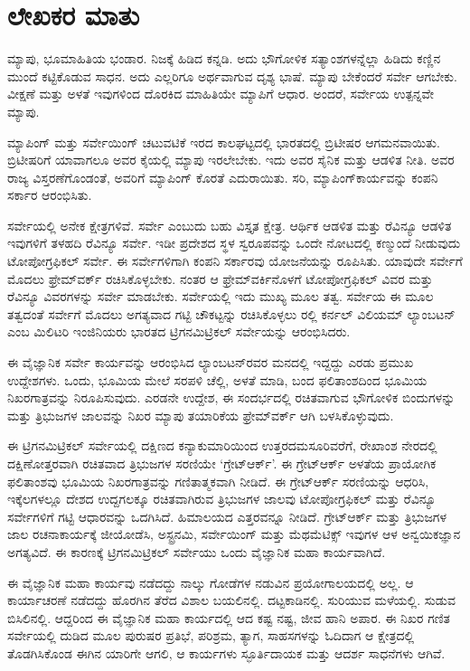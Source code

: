 
\chapter*{ಲೇಖಕರ ಮಾತು}

ಮ್ಯಾಪು, ಭೂಮಾಹಿತಿಯ ಭಂಡಾರ. ನಿಜಕ್ಕೆ ಹಿಡಿದ ಕನ್ನಡಿ. ಅದು ಭೌಗೋಳಿಕ ಸತ್ಯಾಂಶಗಳನ್ನೆಲ್ಲಾ ಹಿಡಿದು ಕಣ್ಣಿನ ಮುಂದೆ ಕಟ್ಟಿಕೊಡುವ ಸಾಧನ. ಅದು ಎಲ್ಲರಿಗೂ ಅರ್ಥವಾಗುವ ದೃಶ್ಯ ಭಾಷೆ. ಮ್ಯಾಪು ಬೇಕೆಂದರೆ ಸರ್ವೇ ಆಗಬೇಕು. ವೀಕ್ಷಣೆ ಮತ್ತು ಅಳತೆ ಇವುಗಳಿಂದ ದೊರಕಿದ ಮಾಹಿತಿಯೇ ಮ್ಯಾಪಿಗೆ ಆಧಾರ. ಅಂದರೆ, ಸರ್ವೇಯ ಉತ್ಪನ್ನವೇ ಮ್ಯಾಪು.

ಮ್ಯಾಪಿಂಗ್​ ಮತ್ತು ಸರ್ವೇಯಿಂಗ್​ ಚಟುವಟಿಕೆ ಇರದ ಕಾಲಘಟ್ಟದಲ್ಲಿ ಭಾರತದಲ್ಲಿ ಬ್ರಿಟೀಷರ ಆಗಮನವಾಯಿತು. ಬ್ರಿಟೀಷರಿಗೆ ಯಾವಾಗಲೂ ಅವರ ಕೈಯಲ್ಲಿ ಮ್ಯಾಪು ಇರಲೇಬೇಕು. ಇದು ಅವರ ಸೈನಿಕ ಮತ್ತು ಆಡಳಿತ ನೀತಿ. ಅವರ ರಾಜ್ಯ ವಿಸ್ತರಣೆಗೊಂಡಂತೆ, ಅವರಿಗೆ ಮ್ಯಾಪಿಂಗ್​ ಕೊರತೆ ಎದುರಾಯಿತು. ಸರಿ, ಮ್ಯಾಪಿಂಗ್​ಕಾರ್ಯವನ್ನು ಕಂಪನಿ ಸರ್ಕಾರ ಆರಂಭಿಸಿತು.

ಸರ್ವೇಯಲ್ಲಿ ಅನೇಕ ಕ್ಷೇತ್ರಗಳಿವೆ. ಸರ್ವೇ ಎಂಬುದು ಬಹು ವಿಸ್ತೃತ ಕ್ಷೇತ್ರ. ಆರ್ಥಿಕ ಆಡಳಿತ ಮತ್ತು ರೆವಿನ್ಯೂ ಆಡಳಿತ ಇವುಗಳಿಗೆ ತಳಹದಿ ರೆವಿನ್ಯೂ ಸರ್ವೇ. ಇಡೀ ಪ್ರದೇಶದ ಸ್ಥಳ ಸ್ವರೂಪವನ್ನು ಒಂದೇ ನೋಟದಲ್ಲಿ ಕಣ್ಮುಂದೆ ನೀಡುವುದು ಟೋಪೋಗ್ರಫಿಕಲ್​ ಸರ್ವೇ. ಈ ಸರ್ವೇಗಳಿಗಾಗಿ ಕಂಪನಿ ಸರ್ಕಾರವು ಯೋಜನೆಯನ್ನು ರೂಪಿಸಿತು. ಯಾವುದೇ ಸರ್ವೇಗೆ ಮೊದಲು ಫ್ರೇಮ್‌ವರ್ಕ್ ರಚಿಸಿಕೊಳ್ಳಬೇಕು. ನಂತರ ಆ ಫ್ರೇಮ್‌ವರ್ಕಿನೊಳಗೆ ಟೋಪೋಗ್ರಫಿಕಲ್​ ವಿವರ ಮತ್ತು ರೆವಿನ್ಯೂ ವಿವರಗಳನ್ನು ಸರ್ವೇ ಮಾಡಬೇಕು. ಸರ್ವೇಯಲ್ಲಿ ಇದು ಮುಖ್ಯ ಮೂಲ ತತ್ವ. ಸರ್ವೇಯ ಈ ಮೂಲ ತತ್ವದಂತೆ ಸರ್ವೇಗೆ ಮೊದಲು ಅಗತ್ಯವಾದ ಗಟ್ಟಿ ಚೌಕಟ್ಟನ್ನು ರಚಿಸಿಕೊಳ್ಳಲು  ರಲ್ಲಿ ಕರ್ನಲ್​ ವಿಲಿಯಮ್ ಲ್ಯಾಂಬಟನ್​ ಎಂಬ ಮಿಲಿಟರಿ ಇಂಜಿನಿಯರು ಭಾರತದ ಟ್ರಿಗನಮಿಟ್ರಿಕಲ್​ ಸರ್ವೇಯನ್ನು ಆರಂಭಿಸಿದರು.

ಈ ವೈಜ್ಞಾನಿಕ ಸರ್ವೇ ಕಾರ್ಯವನ್ನು ಆರಂಭಿಸಿದ ಲ್ಯಾಂಬಟನ್​ರವರ ಮನದಲ್ಲಿ ಇದ್ದದ್ದು ಎರಡು ಪ್ರಮುಖ ಉದ್ದೇಶಗಳು. ಒಂದು, ಭೂಮಿಯ ಮೇಲೆ ಸರಪಳಿ ಚೆಲ್ಲಿ, ಅಳತೆ ಮಾಡಿ, ಬಂದ ಫಲಿತಾಂಶದಿಂದ ಭೂಮಿಯ ನಿಖರಗಾತ್ರವನ್ನು ನಿರೂಪಿಸುವುದು. ಎರಡನೇ ಉದ್ದೇಶ, ಈ ಸಂದರ್ಭದಲ್ಲಿ ರಚಿತವಾಗುವ ಭೌಗೋಳಿಕ ಬಿಂದುಗಳನ್ನು ಮತ್ತು ತ್ರಿಭುಜಗಳ ಜಾಲವನ್ನು ನಿಖರ ಮ್ಯಾಪು ತಯಾರಿಕೆಯ ಫ್ರೇಮ್‌ವರ್ಕ್ ಆಗಿ ಬಳಸಿಕೊಳ್ಳುವುದು.

ಈ ಟ್ರಿಗನಮಿಟ್ರಿಕಲ್​ ಸರ್ವೇಯಲ್ಲಿ ದಕ್ಷಿಣದ ಕನ್ಯಾಕುಮಾರಿಯಿಂದ ಉತ್ತರದ\break ಮಸೂರಿವರೆಗೆ, ರೇಖಾಂಶ ನೇರದಲ್ಲಿ ದಕ್ಷಿಣೋತ್ತರವಾಗಿ ರಚಿತವಾದ ತ್ರಿಭುಜಗಳ ಸರಣಿಯೇ ‘ಗ್ರೇಟ್​ಆರ್ಕ್’. ಈ ಗ್ರೇಟ್​ಆರ್ಕ್ ಅಳತೆಯ ಪ್ರಾಯೋಗಿಕ ಫಲಿತಾಂಶವು ಭೂಮಿಯ ನಿಖರ\-ಗಾತ್ರವನ್ನು ಗಣಿತಾತ್ಮಕವಾಗಿ ನೀಡಿದೆ. ಈ ಗ್ರೇಟ್​ಆರ್ಕ್ ಸರಣಿಯನ್ನು ಆಧರಿಸಿ, ಇಕ್ಕೆಲಗಳಲ್ಲೂ ದೇಶದ ಉದ್ದಗಲಕ್ಕೂ ರಚಿತವಾಗಿರುವ ತ್ರಿಭುಜಗಳ ಜಾಲವು ಟೋಪೋಗ್ರಫಿಕಲ್​ ಮತ್ತು ರೆವಿನ್ಯೂ ಸರ್ವೇಗಳಿಗೆ ಗಟ್ಟಿ ಆಧಾರವನ್ನು ಒದಗಿಸಿದೆ. ಹಿಮಾಲಯದ ಎತ್ತರವನ್ನೂ ನೀಡಿದೆ. ಗ್ರೇಟ್​ಆರ್ಕ್ ಮತ್ತು ತ್ರಿಭುಜಗಳ ಜಾಲ ರಚನಾಕಾರ್ಯಕ್ಕೆ ಜೀಯೋಡೆಸಿ, ಅಸ್ಟ್ರನಮಿ, ಸರ್ವೇಯಿಂಗ್​ ಮತ್ತು ಮೆಥಮೆಟಿಕ್ಸ್​ ಇವುಗಳ ಆಳ ಅನ್ವಯಿಕಜ್ಞಾನ ಅಗತ್ಯವಿದೆ. ಈ ಕಾರಣಕ್ಕೆ ಟ್ರಿಗನಮಿಟ್ರಿಕಲ್​ ಸರ್ವೇಯು ಒಂದು ವೈಜ್ಞಾನಿಕ ಮಹಾ ಕಾರ್ಯವಾಗಿದೆ.

ಈ ವೈಜ್ಞಾನಿಕ ಮಹಾ ಕಾರ್ಯವು ನಡೆದದ್ದು ನಾಲ್ಕು ಗೋಡೆಗಳ ನಡುವಿನ ಪ್ರಯೋ\-ಗಾಲಯದಲ್ಲಿ ಅಲ್ಲ. ಆ ಕಾರ್ಯಾಚರಣೆ ನಡೆದದ್ದು ಹೊರಗಿನ ತೆರೆದ ವಿಶಾಲ ಬಯಲಿನಲ್ಲಿ. ದಟ್ಟಕಾಡಿನಲ್ಲಿ. ಸುರಿಯುವ ಮಳೆಯಲ್ಲಿ. ಸುಡುವ ಬಿಸಿಲಿನಲ್ಲಿ. ಆದ್ದರಿಂದ ಈ ವೈಜ್ಞಾನಿಕ ಮಹಾ ಕಾರ್ಯದಲ್ಲಿ ಆದ ಕಷ್ಟ ನಷ್ಟ, ಜೀವ ಹಾನಿ ಅಪಾರ. ಈ ನಿಖರ ಗಣಿತ ಸರ್ವೇಯಲ್ಲಿ ದುಡಿದ ಮೂಲ ಪುರುಷರ ಪ್ರತಿಭೆ, ಪರಿಶ್ರಮ, ತ್ಯಾಗ, ಸಾಹಸಗಳನ್ನು ಓದಿದಾಗ ಆ ಕ್ಷೇತ್ರದಲ್ಲಿ ತೊಡಗಿಸಿಕೊಂಡ ಈಗಿನ ಯಾರಿಗೇ ಆಗಲಿ, ಆ ಕಾರ್ಯಗಳು ಸ್ಫೂರ್ತಿದಾಯಕ ಮತ್ತು ಆದರ್ಶ ಸಾಧನೆಗಳು ಆಗಿವೆ.


